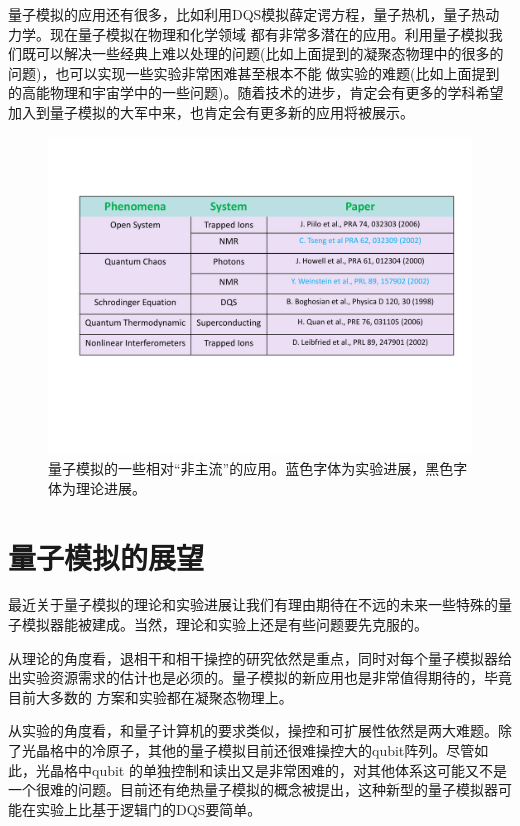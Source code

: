量子模拟的应用还有很多，比如利用DQS模拟薛定谔方程\cite{energy1,others1}，量子热机\cite{others2,others3}，量子热动力学\cite{others4}。现在量子模拟在物理和化学领域
都有非常多潜在的应用。利用量子模拟我们既可以解决一些经典上难以处理的问题(比如上面提到的凝聚态物理中的很多的问题)，也可以实现一些实验非常困难甚至根本不能
做实验的难题(比如上面提到的高能物理和宇宙学中的一些问题)。随着技术的进步，肯定会有更多的学科希望加入到量子模拟的大军中来，也肯定会有更多新的应用将被展示。

\begin{figure}[htbp]
            \begin{center}
              \includegraphics[width= 0.8\columnwidth]{figures/simother.pdf}
              \caption{量子模拟的一些相对“非主流”的应用。蓝色字体为实验进展，黑色字体为理论进展。
              }
              \label{simother}
            \end{center}
\end{figure}

\section{量子模拟的展望}

最近关于量子模拟的理论和实验进展让我们有理由期待在不远的未来一些特殊的量子模拟器能被建成。当然，理论和实验上还是有些问题要先克服的。

从理论的角度看，退相干和相干操控的研究依然是重点，同时对每个量子模拟器给出实验资源需求的估计也是必须的。量子模拟的新应用也是非常值得期待的，毕竟目前大多数的
方案和实验都在凝聚态物理上。

从实验的角度看，和量子计算机的要求类似，操控和可扩展性依然是两大难题。除了光晶格中的冷原子，其他的量子模拟目前还很难操控大的qubit阵列。尽管如此，光晶格中qubit
的单独控制和读出又是非常困难的，对其他体系这可能又不是一个很难的问题。目前还有绝热量子模拟的概念被提出\cite{adiaqs}，这种新型的量子模拟器可能在实验上比基于逻辑门的DQS要简单。



